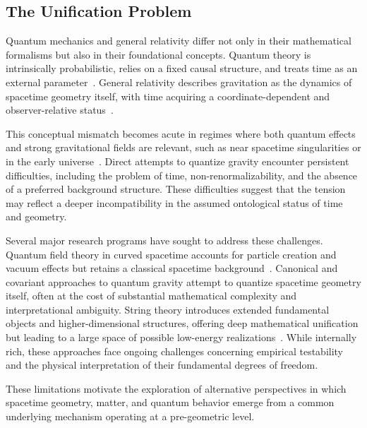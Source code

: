 \subsection{The Unification Problem}
\label{subsec:conceptual-tension-between-quantum-theory-and-gravitation}

Quantum mechanics and general relativity differ not only in their mathematical
formalisms but also in their foundational concepts.
Quantum theory is intrinsically probabilistic, relies on a fixed causal
structure, and treats time as an external
parameter~\cite{Dirac1930,Born1926}.
General relativity describes gravitation as the dynamics of spacetime geometry
itself, with time acquiring a coordinate-dependent and observer-relative
status~\cite{Einstein1915,MisnerThorneWheeler1973}.

This conceptual mismatch becomes acute in regimes where both quantum effects
and strong gravitational fields are relevant, such as near spacetime
singularities or in the early
universe~\cite{penrose1989emperors,Prigogine1997}.
Direct attempts to quantize gravity encounter persistent difficulties,
including the problem of time, non-renormalizability, and the absence of a
preferred background structure.
These difficulties suggest that the tension may reflect a deeper
incompatibility in the assumed ontological status of time and geometry.

Several major research programs have sought to address these challenges.
Quantum field theory in curved spacetime accounts for particle creation and
vacuum effects but retains a classical spacetime
background~\cite{Weinberg1972}.
Canonical and covariant approaches to quantum gravity attempt to quantize
spacetime geometry itself, often at the cost of substantial mathematical
complexity and interpretational ambiguity.
String theory introduces extended fundamental objects and higher-dimensional
structures, offering deep mathematical unification but leading to a large
space of possible low-energy
realizations~\cite{Rovelli2004}.
While internally rich, these approaches face ongoing challenges concerning
empirical testability and the physical interpretation of their fundamental
degrees of freedom.

These limitations motivate the exploration of alternative perspectives in
which spacetime geometry, matter, and quantum behavior emerge from a common
underlying mechanism operating at a pre-geometric level.
